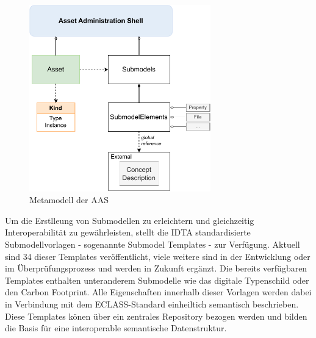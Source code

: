 \begin{figure}[htbp]
    \centering
    \includegraphics[width=0.7\textwidth]{Bilder/Metamodel.pdf}
    \caption{Metamodell der AAS}
    \label{fig:MetamodellAAS}
\end{figure}

Um die Erstlleung von Submodellen zu erleichtern und gleichzeitig Interoperabilität zu gewährleisten, stellt die IDTA standardisierte Submodellvorlagen - sogenannte Submodel Templates - zur Verfügung.
Aktuell sind 34 dieser Templates veröffentlicht, viele weitere sind in der Entwicklung oder im Überprüfungsprozess und werden in Zukunft ergänzt.
Die bereits verfügbaren Templates enthalten unteranderem Submodelle wie das digitale Typenschild oder den Carbon Footprint.
Alle Eigenschaften innerhalb dieser Vorlagen werden dabei in Verbindung mit dem ECLASS-Standard einheiltich semantisch beschrieben.
Diese Templates könen über ein zentrales Repository bezogen werden und bilden die Basis für eine interoperable semantische Datenstruktur.

